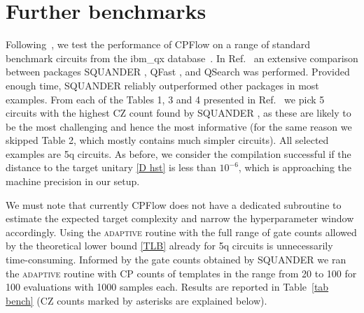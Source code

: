 \documentclass[twocolumn, amsfonts, amssymb, aps, nofootinbib]{revtex4-2}
\newcommand{\CZ}{\textsf{CZ }}
\newcommand{\CP}{\textsf{CP }}
\newcommand{\package}[1]{\textrm {#1 }}
\newcommand{\cpflow}{\package{CPFlow}}
\newcommand{\adaptive}{\textsc{adaptive }}
\begin{document}
\begin{table*}[]
{	}
	\label{tab bench}
\end{table*}

\section{Further benchmarks \label{sec benchmark}}

Following~\cite{Rakyta2022}, we test the performance of \package{CPFlow} on a range of standard benchmark circuits from the ibm\_qx database~\cite{Zulehner2019, ibmqx}. In Ref.~\cite{Rakyta2022} an extensive comparison between packages \package{SQUANDER}, \package{QFast}, and \package{QSearch} was performed. Provided enough time, \package{SQUANDER} reliably outperformed other packages in most examples. From each of the Tables 1, 3 and 4 presented in Ref.~\cite{Rakyta2022} we pick 5 circuits with the highest \CZ count found by \package{SQUANDER}, as these are likely to be the most challenging and hence the most informative (for the same reason we skipped Table 2, which mostly contains much simpler circuits). All selected examples are 5q circuits. As before, we consider the compilation successful if the distance to the target unitary \eqref{D hst} is less than $10^{-6}$, which is approaching the machine precision in our setup. 

We must note that currently \cpflow does not have a dedicated subroutine to estimate the expected target complexity and narrow the hyperparameter window accordingly. Using the \adaptive routine with the full range of gate counts allowed by the theoretical lower bound \eqref{TLB} already for 5q circuits is unnecessarily time-consuming. Informed by the gate counts obtained by \package{SQUANDER} we ran the \adaptive routine with \CP counts of templates in the range from 20 to 100 for 100 evaluations with 1000 samples each. Results are reported in Table~\ref{tab bench} (\CZ counts marked by asterisks are explained below).
\end{document}
